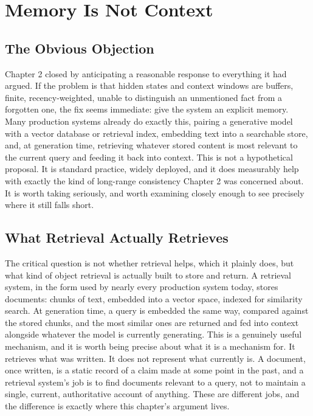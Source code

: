 \chapter{Memory Is Not Context}

\section{The Obvious Objection}

Chapter 2 closed by anticipating a reasonable response to everything it had argued. If the problem is that hidden states and context windows are buffers, finite, recency-weighted, unable to distinguish an unmentioned fact from a forgotten one, the fix seems immediate: give the system an explicit memory. Many production systems already do exactly this, pairing a generative model with a vector database or retrieval index, embedding text into a searchable store, and, at generation time, retrieving whatever stored content is most relevant to the current query and feeding it back into context. This is not a hypothetical proposal. It is standard practice, widely deployed, and it does measurably help with exactly the kind of long-range consistency Chapter 2 was concerned about. It is worth taking seriously, and worth examining closely enough to see precisely where it still falls short.

\section{What Retrieval Actually Retrieves}

The critical question is not whether retrieval helps, which it plainly does, but what kind of object retrieval is actually built to store and return. A retrieval system, in the form used by nearly every production system today, stores documents: chunks of text, embedded into a vector space, indexed for similarity search. At generation time, a query is embedded the same way, compared against the stored chunks, and the most similar ones are returned and fed into context alongside whatever the model is currently generating. This is a genuinely useful mechanism, and it is worth being precise about what it is a mechanism for. It retrieves what was written. It does not represent what currently is. A document, once written, is a static record of a claim made at some point in the past, and a retrieval system's job is to find documents relevant to a query, not to maintain a single, current, authoritative account of anything. These are different jobs, and the difference is exactly where this chapter's argument lives.

